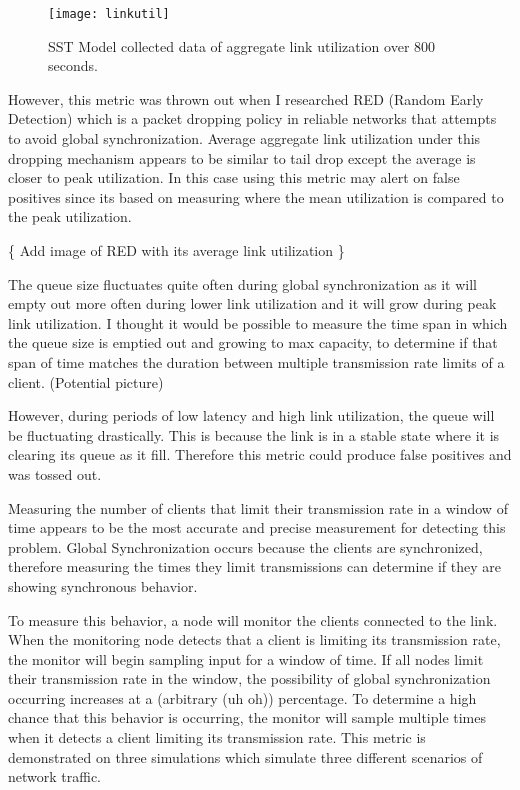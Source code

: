 \documentclass{article}
\begin{document}
	\begin{figure}[H]
	\centering
	\texttt{[image: linkutil]}
	\caption{SST Model collected data of aggregate link utilization over 800 seconds.}
	\end{figure}
	
	\indent However, this metric was thrown out when I researched RED (Random Early Detection) which is a packet dropping policy in reliable networks that attempts to avoid global synchronization. Average aggregate link utilization under this dropping mechanism appears to be similar to tail drop except the average is closer to peak utilization. In this case using this metric may alert on false positives since its based on measuring where the mean utilization is compared to the peak utilization. \newline
	
																			\{ Add image of RED with its average link utilization \}\newline
	
	The queue size fluctuates quite often during global synchronization as it will empty out more often during lower link utilization and it will grow during peak link utilization. I thought it would be possible to measure the time span in which the queue size is emptied out and growing to max capacity, to determine if that span of time matches the duration between multiple transmission rate limits of a client.\newline
	(Potential picture)\newline
	
	However, during periods of low latency and high link utilization, the queue will be fluctuating drastically. This is because the link is in a stable state where it is clearing its queue as it fill. Therefore this metric could produce false positives and was tossed out.\newline
	
	Measuring the number of clients that limit their transmission rate in a window of time appears to be the most accurate and precise measurement for detecting this problem. Global Synchronization occurs because the clients are synchronized, therefore measuring the times they limit transmissions can determine if they are showing synchronous behavior.\newline
																	
	To measure this behavior, a node will monitor the clients connected to the link. When the monitoring node detects that a client is limiting its transmission rate, the monitor will begin sampling input for a window of time. If all nodes limit their transmission rate in the window, the possibility of global synchronization occurring increases at a (arbitrary (uh oh)) percentage. To determine a high chance that this behavior is occurring, the monitor will sample multiple times when it detects a client limiting its transmission rate.\newline
	This metric is demonstrated on three simulations which simulate three different scenarios of network traffic.\newline
	
\end{document}

